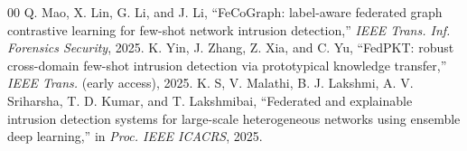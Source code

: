\documentclass[conference,onecolumn]{IEEEtran}
\begin{document}
\begin{thebibliography}{00}
 Q. Mao, X. Lin, G. Li, and J. Li, ``FeCoGraph: label-aware federated graph contrastive learning for few-shot network intrusion detection,'' \textit{IEEE Trans. Inf. Forensics Security}, 2025.
 K. Yin, J. Zhang, Z. Xia, and C. Yu, ``FedPKT: robust cross-domain few-shot intrusion detection via prototypical knowledge transfer,'' \textit{IEEE Trans.} (early access), 2025.
 K. S, V. Malathi, B. J. Lakshmi, A. V. Sriharsha, T. D. Kumar, and T. Lakshmibai, ``Federated and explainable intrusion detection systems for large-scale heterogeneous networks using ensemble deep learning,'' in \textit{Proc. IEEE ICACRS}, 2025.
\end{thebibliography}
\end{document}
